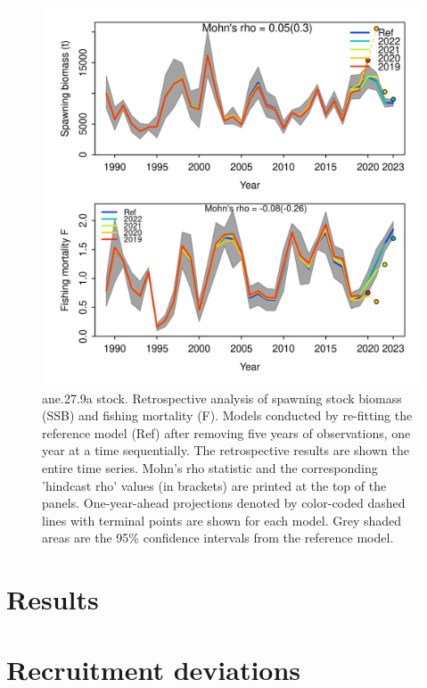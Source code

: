 \documentclass[
]{article}
\begin{document}
\begin{figure}[H]

{\centering \includegraphics[width=0.95\linewidth]{report/retro/S1.0_4FLEETS/Retro} 

}

\caption{ane.27.9a stock. Retrospective analysis of spawning stock biomass (SSB) and fishing mortality (F). Models  conducted by re-fitting the reference model (Ref) after removing five years of observations, one year at a time sequentially. The retrospective results are shown the entire time series. Mohn's rho statistic and the corresponding 'hindcast rho' values (in brackets) are printed at the top of the panels. One-year-ahead projections denoted by color-coded dashed lines with terminal points are shown for each model. Grey shaded areas are the 95\% confidence intervals from the reference model.}\label{fig:unnamed-chunk-29}
\end{figure}

\hypertarget{results}{%
\section{Results}\label{results}}

\hypertarget{recruitment-deviations}{%
\section{Recruitment deviations}\label{recruitment-deviations}}
\end{document}
